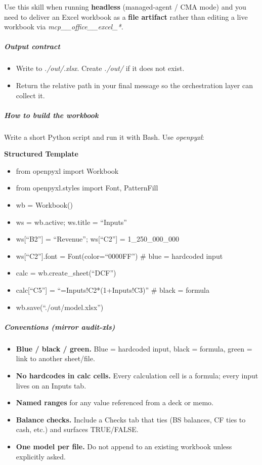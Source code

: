 \documentclass[11pt]{article}
\begin{document}
Use this skill when running \textbf{headless} (managed-agent / CMA mode) and you need to deliver an Excel workbook as a \textbf{file artifact} rather than editing a live workbook via \emph{mcp\_\allowbreak{}\_\allowbreak{}office\_\allowbreak{}\_\allowbreak{}excel\_\allowbreak{}*}.


\subparagraph{Output contract}\mbox{}\par

\begin{itemize}[leftmargin=*,itemsep=2pt,topsep=2pt]
\item {} Write to \emph{./out/.xlsx}. Create \emph{./out/} if it does not exist.
\item {} Return the relative path in your final message so the orchestration layer can collect it.
\end{itemize}

\subparagraph{How to build the workbook}\mbox{}\par

Write a short Python script and run it with Bash. Use \emph{openpyxl}:


\textbf{Structured Template}
\begin{itemize}[leftmargin=*,itemsep=2pt,topsep=2pt]
\item {} from openpyxl import Workbook
\item {} from openpyxl.styles import Font, PatternFill
\item {} wb = Workbook()
\item {} ws = wb.active; ws.title = ``Inputs''
\item {} ws[``B2''] = ``Revenue''; ws[``C2''] = 1\_\allowbreak{}250\_\allowbreak{}000\_\allowbreak{}000
\item {} ws[``C2''].font = Font(color=``0000FF'') \# blue = hardcoded input
\item {} calc = wb.create\_\allowbreak{}sheet(``DCF'')
\item {} calc[``C5''] = ``=Inputs!C2*(1+Inputs!C3)'' \# black = formula
\item {} wb.save(``./out/model.xlsx'')
\end{itemize}

\subparagraph{Conventions (mirror \emph{audit-xls})}\mbox{}\par

\begin{itemize}[leftmargin=*,itemsep=2pt,topsep=2pt]
\item {} \textbf{Blue / black / green.} Blue = hardcoded input, black = formula, green = link to another sheet/file.
\item {} \textbf{No hardcodes in calc cells.} Every calculation cell is a formula; every input lives on an Inputs tab.
\item {} \textbf{Named ranges} for any value referenced from a deck or memo.
\item {} \textbf{Balance checks.} Include a Checks tab that ties (BS balances, CF ties to cash, etc.) and surfaces TRUE/FALSE.
\item {} \textbf{One model per file.} Do not append to an existing workbook unless explicitly asked.
\end{itemize}
\end{document}
